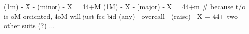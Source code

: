 (1m) - X - (minor) - X = 44+M
(1M) - X - (major) - X = 44+m  # because t/o is oM-oreiented, 4oM will just fee bid
(any) - overcall - (raise) - X = 44+ two other suits (?)
...